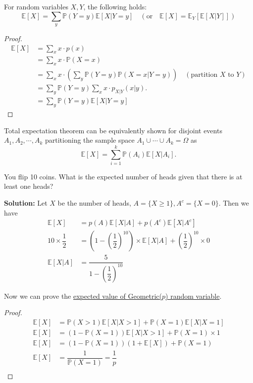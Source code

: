 \begin{theorem}
    For random variables \(X, Y\), the following holds:
    \[
        \mathbb{E}[X] = \sum_{y} \mathbb{P}(Y = y)\mathbb{E}[X \vert Y = y]\quad\left(\text{or}\quad \mathbb{E}[X] = \mathbb{E}_{Y}\left[ \mathbb{E}[X \vert Y]\right]\right)
    \]
    \begin{proof}
        \[
            \begin{aligned}
            \mathbb{E}[X] &= \sum_{x} x \cdot p(x) \\
            &= \sum_{x} x \cdot \mathbb{P}(X = x) \\
            &= \sum_{x} x \cdot \left(\sum_{y} \mathbb{P}(Y = y)\mathbb{P}(X = x \vert Y = y)\right) \quad(\text{partition \(X\) to \(Y\)}) \\
            &= \sum_{y} \mathbb{P}(Y = y) \sum_{x} x \cdot p_{X \vert Y} (x \vert y). \\
            &= \sum_{y} \mathbb{P}(Y = y)\mathbb{E}[X \vert Y = y]
        \end{aligned}
        \]
    \end{proof}
\end{theorem}

Total expectation theorem can be equivalently shown for disjoint events \(A_1, A_2, \cdots, A_k\) partitioning the sample space \(A_1 \cup \cdots \cup A_k = \Omega\) as 
\[
    \mathbb{E}[X] = \sum_{i = 1}^k \mathbb{P}(A_i)\mathbb{E}[X \vert A_i]. 
\] 

\begin{eg}
    You flip 10 coins. What is the expected number of heads given
    that there is at least one heads?

    \textbf{Solution:} 
    Let \(X\) be the number of heads, \(A = \{X \geq 1\}, A^c = \{X = 0\}\). Then we have 
    \[
    \begin{aligned}
        \mathbb{E}[X] &= p(A)\mathbb{E}[X \vert A] + p(A^c)\mathbb{E}[X \vert A^c] \\
        10 \times \dfrac{1}{2} &= \left(1 - (\dfrac{1}{2})^{10}\right) \times \mathbb{E}[X \vert A] + (\dfrac{1}{2})^{10} \times 0\\
        \mathbb{E}[X \vert A] &= \dfrac{5}{1 - (\dfrac{1}{2})^{10}}
    \end{aligned}
    \]
\end{eg}

Now we can prove the \hyperlink{page.27}{expected value of Geometric(\(p\)) random variable}. 
\begin{proof}
    \[
        \begin{aligned}
            \mathbb{E}[X] &= \mathbb{P}(X > 1)\mathbb{E}[X \vert X > 1] + \mathbb{P}(X = 1)\mathbb{E}[X \vert X = 1] \\
            \mathbb{E}[X] &= (1 - \mathbb{P}(X = 1))\mathbb{E}[X \vert X > 1] + \mathbb{P}(X = 1) \times 1 \\
            \mathbb{E}[X] &= (1 - \mathbb{P}(X = 1))(1 + \mathbb{E}[X]) + \mathbb{P}(X = 1)\\
            \mathbb{E}[X] &= \dfrac{1}{\mathbb{P}(X = 1)} = \dfrac{1}{p}\\
        \end{aligned}
    \]
\end{proof}

